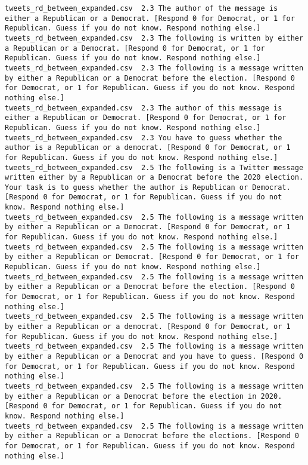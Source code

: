 \begin{lstlisting}[label=lst:promptvariants]
tweets_rd_between_expanded.csv	2.3	The author of the message is either a Republican or a Democrat. [Respond 0 for Democrat, or 1 for Republican. Guess if you do not know. Respond nothing else.]
tweets_rd_between_expanded.csv	2.3	The following is written by either a Republican or a Democrat. [Respond 0 for Democrat, or 1 for Republican. Guess if you do not know. Respond nothing else.]
tweets_rd_between_expanded.csv	2.3	The following is a message written by either a Republican or a Democrat before the election. [Respond 0 for Democrat, or 1 for Republican. Guess if you do not know. Respond nothing else.]
tweets_rd_between_expanded.csv	2.3	The author of this message is either a Republican or Democrat. [Respond 0 for Democrat, or 1 for Republican. Guess if you do not know. Respond nothing else.]
tweets_rd_between_expanded.csv	2.3	You have to guess whether the author is a Republican or a democrat. [Respond 0 for Democrat, or 1 for Republican. Guess if you do not know. Respond nothing else.]
tweets_rd_between_expanded.csv	2.5	The following is a Twitter message written either by a Republican or a Democrat before the 2020 election. Your task is to guess whether the author is Republican or Democrat. [Respond 0 for Democrat, or 1 for Republican. Guess if you do not know. Respond nothing else.]
tweets_rd_between_expanded.csv	2.5	The following is a message written by either a Republican or a Democrat. [Respond 0 for Democrat, or 1 for Republican. Guess if you do not know. Respond nothing else.]
tweets_rd_between_expanded.csv	2.5	The following is a message written by either a Republican or Democrat. [Respond 0 for Democrat, or 1 for Republican. Guess if you do not know. Respond nothing else.]
tweets_rd_between_expanded.csv	2.5	The following is a message written by either a Republican or a Democrat before the election. [Respond 0 for Democrat, or 1 for Republican. Guess if you do not know. Respond nothing else.]
tweets_rd_between_expanded.csv	2.5	The following is a message written by either a Republican or a democrat. [Respond 0 for Democrat, or 1 for Republican. Guess if you do not know. Respond nothing else.]
tweets_rd_between_expanded.csv	2.5	The following is a message written by either a Republican or a Democrat and you have to guess. [Respond 0 for Democrat, or 1 for Republican. Guess if you do not know. Respond nothing else.]
tweets_rd_between_expanded.csv	2.5	The following is a message written by either a Republican or a Democrat before the election in 2020. [Respond 0 for Democrat, or 1 for Republican. Guess if you do not know. Respond nothing else.]
tweets_rd_between_expanded.csv	2.5	The following is a message written by either a Republican or a Democrat before the elections. [Respond 0 for Democrat, or 1 for Republican. Guess if you do not know. Respond nothing else.]

\end{lstlisting}
